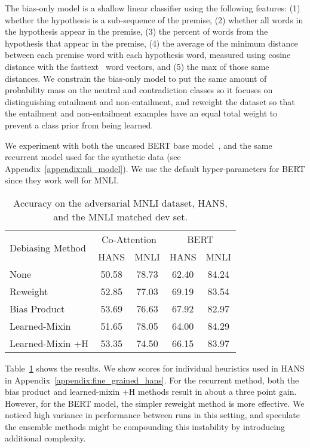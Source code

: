\documentclass[11pt,a4paper]{article}
\begin{document}
 The bias-only model is a shallow linear classifier using the following features: (1) whether the hypothesis is a sub-sequence of the premise, (2) whether all words in the hypothesis appear in the premise, (3) the percent of words from the hypothesis that appear in the premise, (4) the average of the minimum distance between each premise word with each hypothesis word, measured using cosine distance with the fasttext~\cite{fasttext_word_vectors} word vectors, and (5) the max of those same distances. We constrain the bias-only model to put the same amount of probability mass on the neutral and contradiction classes so it focuses on distinguishing entailment and non-entailment, and reweight the dataset so that the entailment and non-entailment examples have an equal total weight to prevent a class prior from being learned.

 We experiment with both the uncased BERT base model~\cite{devlin2018bert}, and the same recurrent model used for the synthetic data (see Appendix~\ref{appendix:nli_model}). We use the default hyper-parameters for BERT since they work well for MNLI.

\begin{table}
\centering
    \tablefont
\begin{tabular}{lcccc} \toprule
\multirow{2}{*}{Debiasing Method} & \multicolumn{2}{c}{Co-Attention} & \multicolumn{2}{c}{BERT}\\
 & HANS & MNLI & HANS & MNLI\\ \midrule
None & 50.58 & 78.73 & 62.40 & 84.24 \\
Reweight & 52.85 & 77.03 & 69.19 & 83.54 \\
Bias Product & 53.69 & 76.63 & 67.92 & 82.97 \\
Learned-Mixin & 51.65 & 78.05 & 64.00 & 84.29 \\
Learned-Mixin +H & 53.35 & 74.50 & 66.15 & 83.97 \\
\bottomrule
\end{tabular}   
\caption{Accuracy on the adversarial MNLI dataset, HANS, and the MNLI matched dev set.}
\label{tab:hans}
\end{table}
 
Table~\ref{tab:hans} shows the results. We show scores for individual heuristics used in HANS in Appendix~\ref{appendix:fine_grained_hans}. For the recurrent method, both the bias product and learned-mixin +H methods result in about a three point gain. However, for the BERT model, the simpler reweight method is more effective. 
We noticed high variance in performance between runs in this setting, and speculate the ensemble methods might be compounding this instability by introducing additional complexity.
\end{document}
